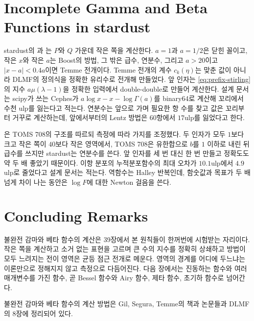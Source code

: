 \section{Incomplete Gamma and Beta Functions in stardust}
\label{sec:special2-stardust}

\begin{instardust}
stardust의 과 는 $P$와 $Q$ 가운데 작은 쪽을 계산한다. $a=1$과 $a=1/2$은 닫힌 꼴이고, 작은 $x$와 작은 $a$는 Boost의 방법, 그 밖은 급수, 연분수, 그리고 $a>20$이고 $|x-a|<0.4a$이면 Temme 전개이다. Temme 전개의 계수 $c_k(\eta)$는 맞춘 값이 아니라 DLMF의 정의식을 정확한 유리수로 전개해 만들었다. 앞 인자는 \eqref{eq:prefix-stirling}의 지수 $a\mu(\lambda-1)$을 정확한 입력에서 double-double로 만들어 계산한다. 설계 문서는 scipy가 쓰는 Cephes가 $a\log x-x-\log\Gamma(a)$를 binary64로 계산해 꼬리에서 수천 ulp를 잃는다고 적는다. 연분수는 앞으로 가며 필요한 항 수를 찾고 값은 꼬리부터 거꾸로 계산하는데, 앞에서부터의 Lentz 방법은 60항에서 $17$ulp를 잃었다고 한다.
\end{instardust}

\begin{instardust}
은 TOMS 708의 구조를 따르되 측정에 따라 가지를 조정했다. 두 인자가 모두 $1$보다 크고 작은 쪽이 $40$보다 작은 영역에서, TOMS 708은 유한합으로 $b$를 $1$ 이하로 내린 뒤 급수를 쓰지만 stardust는 연분수를 쓴다. 앞 인자를 세 번 대신 한 번 만들고 정확도도 약 두 배 좋았기 때문이다. 이항 분포의 누적분포함수의 최대 오차가 $10.1$ulp에서 $4.9$ulp로 줄었다고 설계 문서는 적는다. 역함수는 Halley 반복인데, 함숫값과 목표가 두 배 넘게 차이 나는 동안은 $\log F$에 대한 Newton 걸음을 쓴다.
\end{instardust}

\section{Concluding Remarks}

불완전 감마와 베타 함수의 계산은 39장에서 본 원칙들이 한꺼번에 시험받는 자리이다. 작은 쪽을 계산하고 소거 없는 표현을 고르며 큰 수의 지수를 정확히 상쇄하고 방법이 모두 느려지는 전이 영역은 균등 점근 전개로 메운다. 영역의 경계를 어디에 두느냐는 이론만으로 정해지지 않고 측정으로 다듬어진다. 다음 장에서는 진동하는 함수와 여러 매개변수를 가진 함수, 곧 Bessel 함수와 Airy 함수, 제타 함수, 초기하 함수로 넘어간다.

불완전 감마와 베타 함수의 계산 방법은 Gil, Segura, Temme의 책과 논문들\cite{gil2012igamma}과 DLMF의 8장\cite{dlmf}에 정리되어 있다.

\chapterreferences
